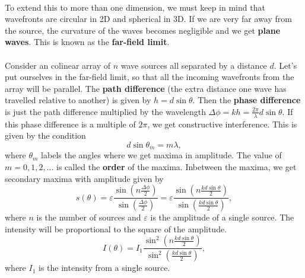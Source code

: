 \documentclass[../classical_mechanics.tex]{subfiles}
\begin{document}
        \paragraph{}
        To extend this to more than one dimension, we must keep in mind that wavefronts are circular in 2D and spherical in 3D.
        If we are very far away from the source, the curvature of the waves becomes negligible and we get \textbf{plane waves}.
        This is known as the \textbf{far-field limit}.

        \paragraph{}
        Consider an colinear array of $n$ wave sources all separated by a distance $d$.
        Let's put ourselves in the far-field limit, so that all the incoming wavefronts from the array will be parallel.
        The \textbf{path difference} (the extra distance one wave has travelled relative to another) is given by $h=d\sin\theta$.
        Then the \textbf{phase difference} is just the path difference multiplied by the wavelength $\Delta\phi=kh=\frac{2\pi}{\lambda}d\sin\theta$.
        If this phase difference is a multiple of $2\pi$, we get constructive interference.
        This is given by the condition
        \begin{equation}
            d\sin\theta_m=m\lambda,
        \end{equation}
        where $\theta_m$ labels the angles where we get maxima in amplitude.
        The value of $m=0,1,2,...$ is called the \textbf{order} of the maxima.
        Inbetween the maxima, we get secondary maxima with amplitude given by
        \begin{equation}
            s(\theta)=\varepsilon\frac{\sin\left(n\frac{\Delta\phi}{2}\right)}{\sin\left(\frac{\Delta\phi}{2}\right)}=\varepsilon\frac{\sin\left(n\frac{kd\sin\theta}{2}\right)}{\sin\left(\frac{kd\sin\theta}{2}\right)},
        \end{equation}
        where $n$ is the number of sources and $\varepsilon$ is the amplitude of a single source.
        The intensity will be proportional to the square of the amplitude.
        \begin{equation}
            I(\theta)=I_1\frac{\sin^2\left(n\frac{kd\sin\theta}{2}\right)}{\sin^2\left(\frac{kd\sin\theta}{2}\right)},
        \end{equation}
        where $I_1$ is the intensity from a single source.
\end{document}
